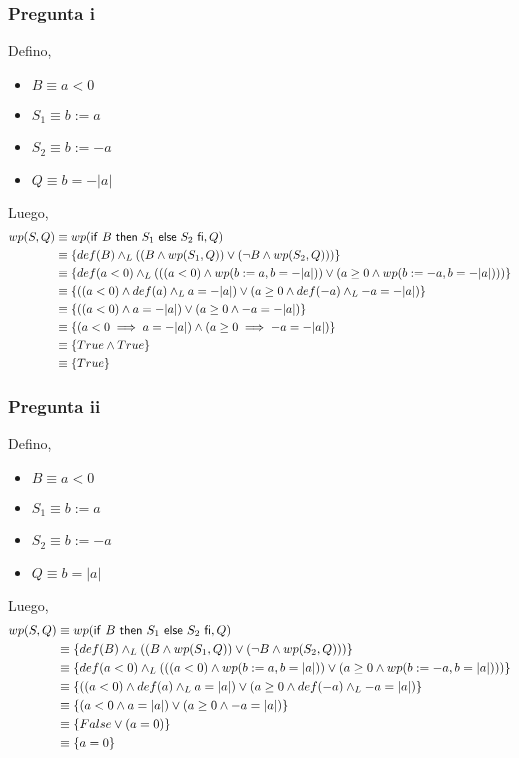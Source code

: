 \subsubsection{Pregunta i}
Defino,
\begin{itemize}
    \item $ B \equiv a < 0 $
    \item $ S_1 \equiv b := a $
    \item $ S_2 \equiv b := -a $
    \item $ Q \equiv b = -|a| $
\end{itemize}
Luego,
\begin{align*}
    wp(S, Q) &\equiv wp(\mathsf{if}\ B\ \mathsf{then}\ S_1\ \mathsf{else}\ S_2\ \mathsf{fi}, Q) \\
    &\equiv \{ def(B) \land _L ((B \wedge wp(S_1, Q)) \vee (\neg B \wedge wp(S_2, Q))) \} \\
    &\equiv \{ def(a < 0) \land _L (((a<0) \wedge wp(b := a, b = -|a|)) \vee (a \geq 0 \wedge wp( b := -a, b = -|a|))) \} \\
    &\equiv \{ ((a<0) \wedge def(a) \land _L a = -|a|) \vee (a \geq 0 \wedge def(-a) \land _L -a = -|a|) \} \\
    &\equiv \{ ((a<0) \wedge a = -|a|) \vee (a \geq 0 \wedge -a = -|a|) \} \\
    &\equiv \{ (a<0 \implies a = -|a|) \wedge (a \geq 0 \implies -a = -|a|) \} \\
    &\equiv \{ True \wedge True \} \\
    &\equiv \{ True \} \\
\end{align*}

\subsubsection{Pregunta ii}
Defino,
\begin{itemize}
    \item $ B \equiv a < 0 $
    \item $ S_1 \equiv b := a $
    \item $ S_2 \equiv b := -a $
    \item $ Q \equiv b = |a| $
\end{itemize}
Luego,
\begin{align*}
    wp(S, Q) &\equiv wp(\mathsf{if}\ B\ \mathsf{then}\ S_1\ \mathsf{else}\ S_2\ \mathsf{fi}, Q) \\
    &\equiv \{ def(B) \land _L ((B \wedge wp(S_1, Q)) \vee (\neg B \wedge wp(S_2, Q))) \} \\
    &\equiv \{ def(a < 0) \land _L (((a<0) \wedge wp(b := a, b = |a|)) \vee (a \geq 0 \wedge wp( b := -a, b = |a|))) \} \\
    &\equiv \{ ((a<0) \wedge def(a) \land _L a = |a|) \vee (a \geq 0 \wedge def(-a) \land _L -a = |a|) \} \\
    &\equiv \{ (a<0 \wedge a = |a|) \vee (a \geq 0 \wedge -a = |a|) \} \\
    &\equiv \{ False \vee (a = 0) \} \\
    &\equiv \{ a = 0 \} \\
\end{align*}



